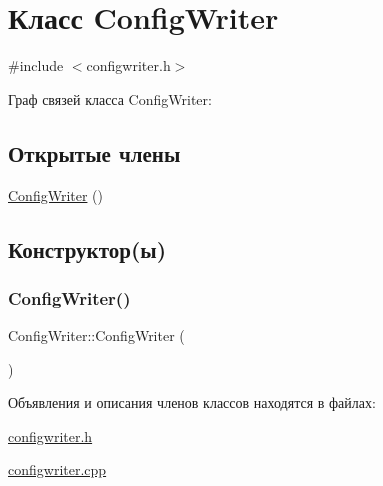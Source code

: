 \hypertarget{class_config_writer}{}\section{Класс Config\+Writer}
\label{class_config_writer}


{\ttfamily \#include $<$configwriter.\+h$>$}



Граф связей класса Config\+Writer\+:
\subsection*{Открытые члены}
\begin{DoxyCompactItemize}
\item 
\hyperlink{class_config_writer_a16c018ea4b4cee7d9506066f69272c62}{Config\+Writer} ()
\end{DoxyCompactItemize}


\subsection{Конструктор(ы)}
\mbox{\label{class_config_writer_a16c018ea4b4cee7d9506066f69272c62}} 
\subsubsection{\texorpdfstring{Config\+Writer()}{ConfigWriter()}}
{\footnotesize\ttfamily Config\+Writer\+::\+Config\+Writer (\begin{DoxyParamCaption}{ }\end{DoxyParamCaption})}



Объявления и описания членов классов находятся в файлах\+:\begin{DoxyCompactItemize}
\item 
\hyperlink{configwriter_8h}{configwriter.\+h}\item 
\hyperlink{configwriter_8cpp}{configwriter.\+cpp}\end{DoxyCompactItemize}
